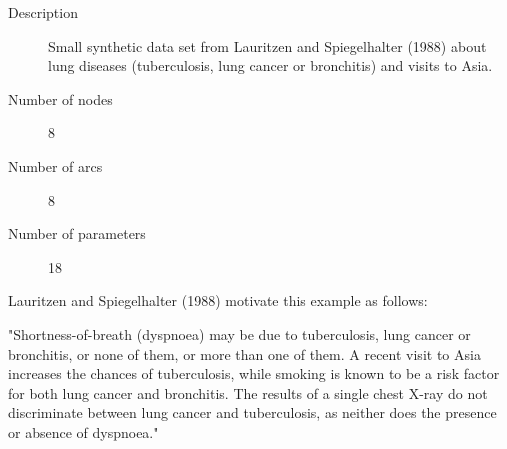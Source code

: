 \begin{description}
	\item[Description] Small synthetic data set from Lauritzen and Spiegelhalter (1988) about lung diseases (tuberculosis, lung cancer or bronchitis) and visits to Asia.

	\item[Number of nodes] 8
	
	\item[Number of arcs] 8
	
	\item[Number of parameters] 18
\end{description}

Lauritzen and Spiegelhalter (1988) motivate this example as follows:

"Shortness-of-breath (dyspnoea) may be due to tuberculosis, lung cancer or bronchitis, or none of them, or more than one of them. A recent visit to Asia increases the chances of tuberculosis, while smoking is known to be a risk factor for both lung cancer and bronchitis. The results of a single chest X-ray do not discriminate between lung cancer and tuberculosis, as neither does the presence or absence of dyspnoea."

